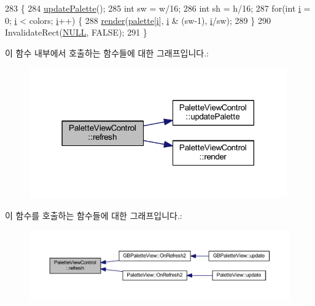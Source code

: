\begin{DoxyCode}
283 \{
284   \mbox{\hyperlink{class_palette_view_control_a12772d59f8e890a920cb200d2f6a4b7a}{updatePalette}}();
285   \textcolor{keywordtype}{int} sw = w/16;
286   \textcolor{keywordtype}{int} sh = h/16;
287   \textcolor{keywordflow}{for}(\textcolor{keywordtype}{int} \mbox{\hyperlink{expr-lex_8cpp_acb559820d9ca11295b4500f179ef6392}{i}} = 0; \mbox{\hyperlink{expr-lex_8cpp_acb559820d9ca11295b4500f179ef6392}{i}} < colors; \mbox{\hyperlink{expr-lex_8cpp_acb559820d9ca11295b4500f179ef6392}{i}}++) \{
288     \mbox{\hyperlink{class_palette_view_control_adbcdd372f28027690355099e14b669d1}{render}}(\mbox{\hyperlink{class_palette_view_control_a1a5ce1812cf6c8d26889f4eb03d1d4ec}{palette}}[\mbox{\hyperlink{expr-lex_8cpp_acb559820d9ca11295b4500f179ef6392}{i}}], \mbox{\hyperlink{expr-lex_8cpp_acb559820d9ca11295b4500f179ef6392}{i}} & (sw-1), \mbox{\hyperlink{expr-lex_8cpp_acb559820d9ca11295b4500f179ef6392}{i}}/sw);
289   \}
290   InvalidateRect(\mbox{\hyperlink{getopt1_8c_a070d2ce7b6bb7e5c05602aa8c308d0c4}{NULL}}, FALSE);
291 \}
\end{DoxyCode}
이 함수 내부에서 호출하는 함수들에 대한 그래프입니다.\+:
\nopagebreak
\begin{figure}[H]
\begin{center}
\leavevmode
\includegraphics[width=314pt]{class_palette_view_control_aace3ab97afe8216b3873159ee852779f_cgraph}
\end{center}
\end{figure}
이 함수를 호출하는 함수들에 대한 그래프입니다.\+:
\nopagebreak
\begin{figure}[H]
\begin{center}
\leavevmode
\includegraphics[width=350pt]{class_palette_view_control_aace3ab97afe8216b3873159ee852779f_icgraph}
\end{center}
\end{figure}
\mbox{\label{class_palette_view_control_add54d86e21f3acfcdc129dd656109c83}} 
